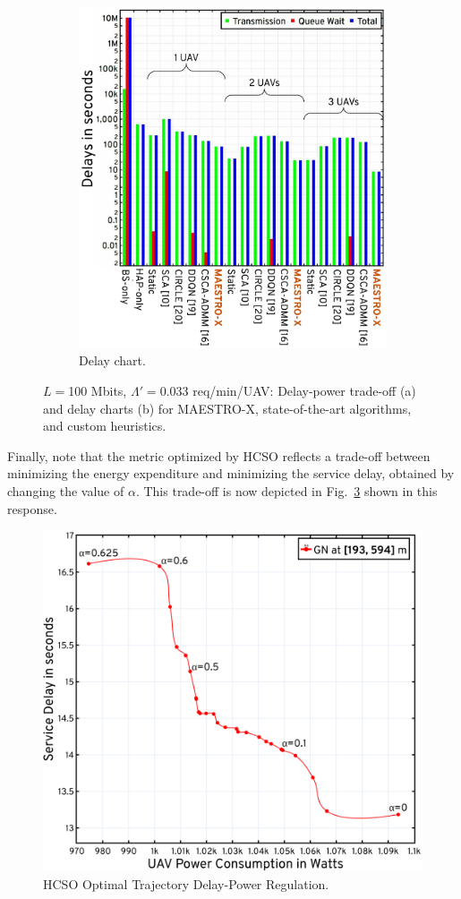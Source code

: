 \documentclass[12pt, draftcls, onecolumn]{IEEEtran}
\theoremstyle{plain}
\theoremstyle{definition}
\theoremstyle{remark}
\begin{document}
\begin{enumerate}
\begin{figure} [t]
\begin{subfigure}{0.455\linewidth}
             \includegraphics[width=1.0\linewidth]{figs/Delay_Power_100Mb_Chart_Low_Congestion.jpeg}
             \caption{Delay chart.}
             \label{FRC4}
         \end{subfigure}
         \caption{$L{=}$100 Mbits, $\Lambda'{=}$0.033 req/min/UAV: Delay-power trade-off (a) and delay charts (b) for MAESTRO-X, state-of-the-art algorithms, and custom heuristics.}
         \label{FRC3and4}
    \end{figure}

    Finally, note that the metric optimized by HCSO reflects a trade-off between minimizing the energy expenditure and minimizing the service delay, obtained by changing the value of $\alpha$.
    This trade-off is now depicted in Fig.~\ref{FRC7} shown in this response.
    \begin{figure} [t]
             \centering
             \includegraphics[width=.6\linewidth]{figs/HCSO_Cost_Analysis_Alpha.jpg}
             \caption{HCSO Optimal Trajectory Delay-Power Regulation.}
             \label{FRC7}
    \end{figure}
    \vspace{2mm}
    

\end{enumerate}
\end{document}
